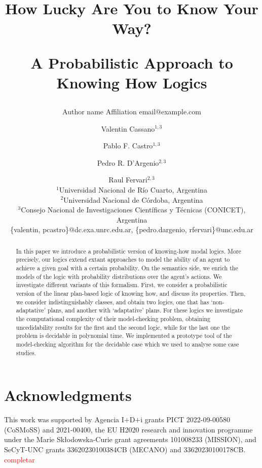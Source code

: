 \documentclass{article}
\title{How Lucky Are You to Know Your Way?\par A Probabilistic Approach to Knowing How Logics}
\author{%
    Author name
    \affiliations
    Affiliation
    \emails
    email@example.com    %
}
\author{%
Valentin Cassano$^{1,3}$\and
Pablo F. Castro$^{1,3}$\and
Pedro R. D'Argenio$^{2,3}$\and
Raul Fervari$^{2,3}$ \\
\affiliations
$^1$Universidad Nacional de R\'io Cuarto, Argentina\\
$^2$Universidad Nacional de C\'ordoba, Argentina\\
$^3$Consejo Nacional de Investigaciones Cient\'ificas y T\'ecnicas (CONICET), Argentina\\
\emails
\{valentin, pcastro\}@dc.exa.unrc.edu.ar,
\{pedro.dargenio, rfervari\}@unc.edu.ar
}
\begin{document}
\maketitle
{}

\begin{abstract}
  In this paper we introduce a probabilistic version of knowing-how modal logics.  More precisely,  our logics extend extant approaches to model the ability of an agent to achieve a given goal with a certain probability.  On the semantics side,  we enrich the models of the logic with probability distributions over the agent's actions.  We investigate different variants of this formalism.  First,  we consider a probabilistic version of the linear plan-based logic of knowing how, and discuss its properties. Then, we consider indistinguishably classes,  and obtain two logics,  one that has `non-adaptative' plans, and another  with `adaptative' plans. For these logics we investigate the computational complexity of their model-checking problem, obtaining uncedidability results for the first and the second logic, while for the last one the problem is decidable in polynomial time.  We implemented a prototype tool of the model-checking algorithm for the decidable case which we used to analyse some case studies.
\end{abstract}







\section*{Acknowledgments}

This work was supported by Agencia I$+$D$+$i grants PICT 2022-09-00580
({\scriptsize CoSMoSS}) and 
2021-00400,
%
the EU H2020 research and innovation programme
under the Marie Sk{\l}odowska-Curie grant agreements 101008233
({\scriptsize MISSION}),
%
and SeCyT-UNC grants 33620230100384CB ({\scriptsize MECANO}) and 33620230100178CB.
%
\textcolor{red}{completar}




\appendix






\end{document}
